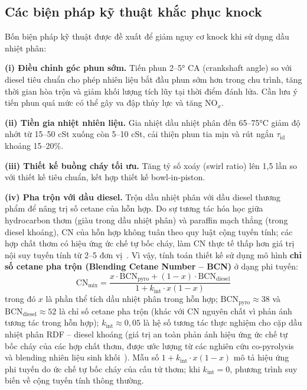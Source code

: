 \documentclass[../main.tex]{subfiles}
\begin{document}
\subsection{Các biện pháp kỹ thuật khắc phục knock}
\label{sec:kien-nghi-knock}

Bốn biện pháp kỹ thuật được đề xuất để giảm nguy cơ knock khi sử dụng dầu nhiệt phân:

\textbf{(i) Điều chỉnh góc phun sớm.} Tiến phun 2--5° CA (crankshaft angle) so với diesel tiêu chuẩn cho phép nhiên liệu bắt đầu phun sớm hơn trong chu trình, tăng thời gian hòa trộn và giảm khối lượng tích lũy tại thời điểm đánh lửa. Cần lưu ý tiến phun quá mức có thể gây va đập thủy lực và tăng NO$_x$.

\textbf{(ii) Tiền gia nhiệt nhiên liệu.} Gia nhiệt dầu nhiệt phân đến 65--75°C giảm độ nhớt từ 15--50 cSt xuống còn 5--10 cSt, cải thiện phun tia mịn và rút ngắn $\tau_{\text{id}}$ khoảng 15--20\%.

\textbf{(iii) Thiết kế buồng cháy tối ưu.} Tăng tỷ số xoáy (swirl ratio) lên 1,5 lần so với thiết kế tiêu chuẩn, kết hợp thiết kế bowl-in-piston.

\textbf{(iv) Pha trộn với dầu diesel.} Trộn dầu nhiệt phân với dầu diesel thương phẩm để nâng trị số cetane của hỗn hợp. Do sự tương tác hóa học giữa hydrocarbon thơm (giàu trong dầu nhiệt phân) và paraffin mạch thẳng (trong diesel khoáng), CN của hỗn hợp không tuân theo quy luật cộng tuyến tính; các hợp chất thơm có hiệu ứng ức chế tự bốc cháy, làm CN thực tế thấp hơn giá trị nội suy tuyến tính từ 2--5 đơn vị~\cite{Heywood1988}. Vì vậy, tính toán thiết kế sử dụng mô hình \textbf{chỉ số cetane pha trộn (Blending Cetane Number -- BCN)} ở dạng phi tuyến:
\begin{equation}
\text{CN}_{\text{mix}} = \frac{x \cdot \text{BCN}_{\text{pyro}} + (1 - x) \cdot \text{BCN}_{\text{diesel}}}
{1 + k_{\text{int}} \cdot x (1 - x)}
\label{eq:cn-blend}
\end{equation}
trong đó $x$ là phần thể tích dầu nhiệt phân trong hỗn hợp; $\text{BCN}_{\text{pyro}} \approx 38$ và $\text{BCN}_{\text{diesel}} \approx 52$ là chỉ số cetane pha trộn (khác với CN nguyên chất vì phản ánh tương tác trong hỗn hợp); $k_{\text{int}} \approx 0{,}05$ là hệ số tương tác thực nghiệm cho cặp dầu nhiệt phân RDF -- diesel khoáng (giá trị an toàn phản ánh hiệu ứng ức chế tự bốc cháy của các hợp chất thơm, được ước lượng từ các nghiên cứu co-pyrolysis và blending nhiên liệu sinh khối~\cite{Williams2007}). Mẫu số $1 + k_{\text{int}} \cdot x (1 - x)$ mô tả hiệu ứng phi tuyến do ức chế tự bốc cháy của cấu tử thơm; khi $k_{\text{int}} = 0$, phương trình suy biến về cộng tuyến tính thông thường.
\end{document}
